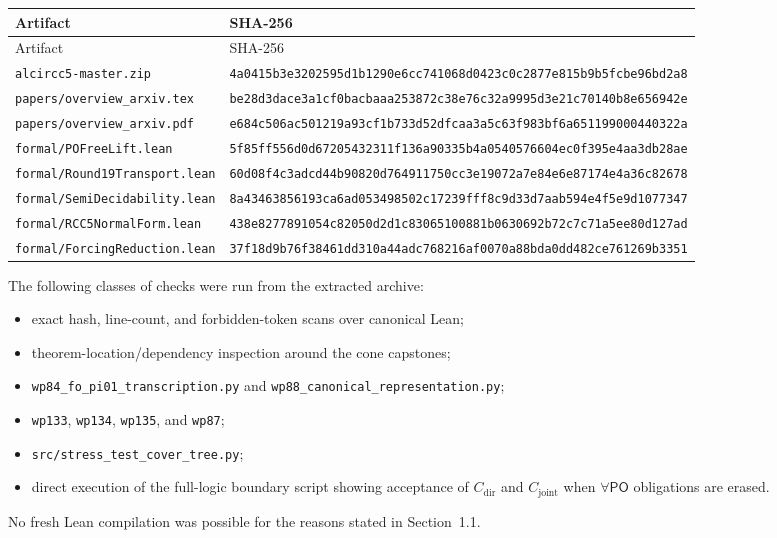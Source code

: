\documentclass[11pt]{article}
\newcommand{\PO}{\ensuremath{\mathsf{PO}}}
\newcommand{\code}[1]{\texttt{#1}}
\begin{document}
\small
\begin{longtable}{L{0.32\textwidth}L{0.61\textwidth}}
\toprule
Artifact & SHA-256 \\
\midrule
\endfirsthead
\toprule
Artifact & SHA-256 \\
\midrule
\endhead
\code{alcircc5-master.zip} & \nolinkurl{4a0415b3e3202595d1b1290e6cc741068d0423c0c2877e815b9b5fcbe96bd2a8} \\
\code{papers/overview\_arxiv.tex} & \nolinkurl{be28d3dace3a1cf0bacbaaa253872c38e76c32a9995d3e21c70140b8e656942e} \\
\code{papers/overview\_arxiv.pdf} & \nolinkurl{e684c506ac501219a93cf1b733d52dfcaa3a5c63f983bf6a651199000440322a} \\
\code{formal/POFreeLift.lean} & \nolinkurl{5f85ff556d0d67205432311f136a90335b4a0540576604ec0f395e4aa3db28ae} \\
\code{formal/Round19Transport.lean} & \nolinkurl{60d08f4c3adcd44b90820d764911750cc3e19072a7e84e6e87174e4a36c82678} \\
\code{formal/SemiDecidability.lean} & \nolinkurl{8a43463856193ca6ad053498502c17239fff8c9d33d7aab594e4f5e9d1077347} \\
\code{formal/RCC5NormalForm.lean} & \nolinkurl{438e8277891054c82050d2d1c83065100881b0630692b72c7c71a5ee80d127ad} \\
\code{formal/ForcingReduction.lean} & \nolinkurl{37f18d9b76f38461dd310a44adc768216af0070a88bda0dd482ce761269b3351} \\
\bottomrule
\end{longtable}
\normalsize

The following classes of checks were run from the extracted archive:
\begin{itemize}
  \item exact hash, line-count, and forbidden-token scans over canonical Lean;
  \item theorem-location/dependency inspection around the cone capstones;
  \item \code{wp84\_fo\_pi01\_transcription.py} and
        \code{wp88\_canonical\_representation.py};
  \item \code{wp133}, \code{wp134}, \code{wp135}, and \code{wp87};
  \item \code{src/stress\_test\_cover\_tree.py};
  \item direct execution of the full-logic boundary script showing acceptance
        of \(C_{\mathrm{dir}}\) and \(C_{\mathrm{joint}}\) when
        \(\forall\PO\) obligations are erased.
\end{itemize}
No fresh Lean compilation was possible for the reasons stated in Section~1.1.
\end{document}
